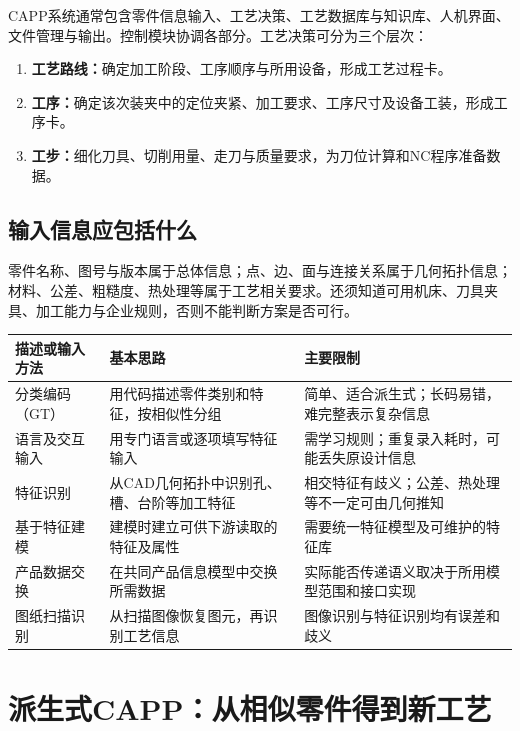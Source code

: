 CAPP系统通常包含零件信息输入、工艺决策、工艺数据库与知识库、人机界面、文件管理与输出。控制模块协调各部分。工艺决策可分为三个层次：
\begin{enumerate}
\item \textbf{工艺路线：}确定加工阶段、工序顺序与所用设备，形成工艺过程卡。
\item \textbf{工序：}确定该次装夹中的定位夹紧、加工要求、工序尺寸及设备工装，形成工序卡。
\item \textbf{工步：}细化刀具、切削用量、走刀与质量要求，为刀位计算和NC程序准备数据。
\end{enumerate}

\subsection{输入信息应包括什么}
零件名称、图号与版本属于总体信息；点、边、面与连接关系属于几何拓扑信息；材料、公差、粗糙度、热处理等属于工艺相关要求。还须知道可用机床、刀具夹具、加工能力与企业规则，否则不能判断方案是否可行。

\begin{center}
\begin{tabularx}{\linewidth}{@{}p{.23\linewidth}XX@{}}
\toprule
描述或输入方法 & 基本思路 & 主要限制\\
\midrule
分类编码（GT） & 用代码描述零件类别和特征，按相似性分组 & 简单、适合派生式；长码易错，难完整表示复杂信息\\
语言及交互输入 & 用专门语言或逐项填写特征输入 & 需学习规则；重复录入耗时，可能丢失原设计信息\\
特征识别 & 从CAD几何拓扑中识别孔、槽、台阶等加工特征 & 相交特征有歧义；公差、热处理等不一定可由几何推知\\
基于特征建模 & 建模时建立可供下游读取的特征及属性 & 需要统一特征模型及可维护的特征库\\
产品数据交换 & 在共同产品信息模型中交换所需数据 & 实际能否传递语义取决于所用模型范围和接口实现\\
图纸扫描识别 & 从扫描图像恢复图元，再识别工艺信息 & 图像识别与特征识别均有误差和歧义\\
\bottomrule
\end{tabularx}
\end{center}


\section{派生式CAPP：从相似零件得到新工艺}

